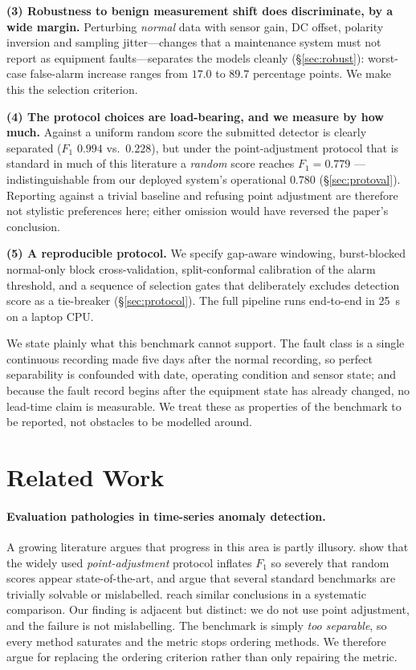 \documentclass{article}
\begin{document}
\textbf{(3) Robustness to benign measurement shift does discriminate, by a
wide margin.} Perturbing \emph{normal} data with sensor gain, DC offset,
polarity inversion and sampling jitter---changes that a maintenance system
must not report as equipment faults---separates the models cleanly
(\S\ref{sec:robust}): worst-case false-alarm increase ranges from $17.0$ to
$89.7$ percentage points. We make this the selection criterion.

\textbf{(4) The protocol choices are load-bearing, and we measure by how much.}
Against a uniform random score the submitted detector is clearly separated
($F_1$ $0.994$ vs.\ $0.228$), but under the point-adjustment protocol that is
standard in much of this literature a \emph{random} score reaches $F_1=0.779$
--- indistinguishable from our deployed system's operational $0.780$
(\S\ref{sec:protoval}). Reporting against a trivial baseline and refusing
point adjustment are therefore not stylistic preferences here; either omission
would have reversed the paper's conclusion.

\textbf{(5) A reproducible protocol.} We specify gap-aware windowing,
burst-blocked normal-only block cross-validation, split-conformal calibration
of the alarm threshold, and a sequence of selection gates that deliberately
excludes detection score as a tie-breaker (\S\ref{sec:protocol}). The full
pipeline runs end-to-end in \SI{25}{\second} on a laptop CPU.

We state plainly what this benchmark cannot support. The fault class is a
single continuous recording made five days after the normal recording, so
perfect separability is confounded with date, operating condition and sensor
state; and because the fault record begins after the equipment state has
already changed, no lead-time claim is measurable. We treat these as
properties of the benchmark to be reported, not obstacles to be modelled
around.

\section{Related Work}
\label{sec:related}

\paragraph{Evaluation pathologies in time-series anomaly detection.}
A growing literature argues that progress in this area is partly illusory.
\citet{kim2022towards} show that the widely used \emph{point-adjustment}
protocol inflates $F_1$ so severely that random scores appear
state-of-the-art, and \citet{wu2023current} argue that several standard
benchmarks are trivially solvable or mislabelled. \citet{garg2022evaluation}
reach similar conclusions in a systematic comparison. Our finding is adjacent
but distinct: we do not use point adjustment, and the failure is not
mislabelling. The benchmark is simply \emph{too separable}, so every method
saturates and the metric stops ordering methods. We therefore argue for
replacing the ordering criterion rather than only repairing the metric.
\end{document}
